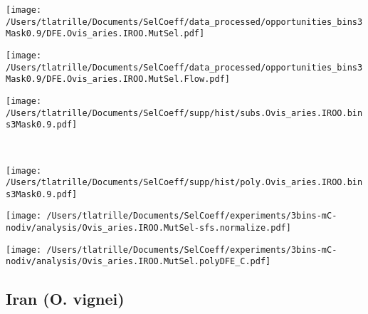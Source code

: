 \documentclass{article}
\begin{document}
    \begin{minipage}{0.32\linewidth}
        \texttt{[image: /Users/tlatrille/Documents/SelCoeff/data\_processed/opportunities\_bins3Mask0.9/DFE.Ovis\_aries.IROO.MutSel.pdf]}
    \end{minipage}
    \begin{minipage}{0.32\linewidth}
        \texttt{[image: /Users/tlatrille/Documents/SelCoeff/data\_processed/opportunities\_bins3Mask0.9/DFE.Ovis\_aries.IROO.MutSel.Flow.pdf]}
    \end{minipage}
    \begin{minipage}{0.32\linewidth}
        \texttt{[image: /Users/tlatrille/Documents/SelCoeff/supp/hist/subs.Ovis\_aries.IROO.bins3Mask0.9.pdf]}
    \end{minipage}
    \\
    \begin{minipage}{0.32\linewidth}
        \texttt{[image: /Users/tlatrille/Documents/SelCoeff/supp/hist/poly.Ovis\_aries.IROO.bins3Mask0.9.pdf]}
    \end{minipage}
    \begin{minipage}{0.32\linewidth}
        \texttt{[image: /Users/tlatrille/Documents/SelCoeff/experiments/3bins-mC-nodiv/analysis/Ovis\_aries.IROO.MutSel-sfs.normalize.pdf]}
    \end{minipage}
    \begin{minipage}{0.32\linewidth}
        \texttt{[image: /Users/tlatrille/Documents/SelCoeff/experiments/3bins-mC-nodiv/analysis/Ovis\_aries.IROO.MutSel.polyDFE\_C.pdf]}
    \end{minipage}
    \subsection{Iran (O. vignei)}
\end{document}
